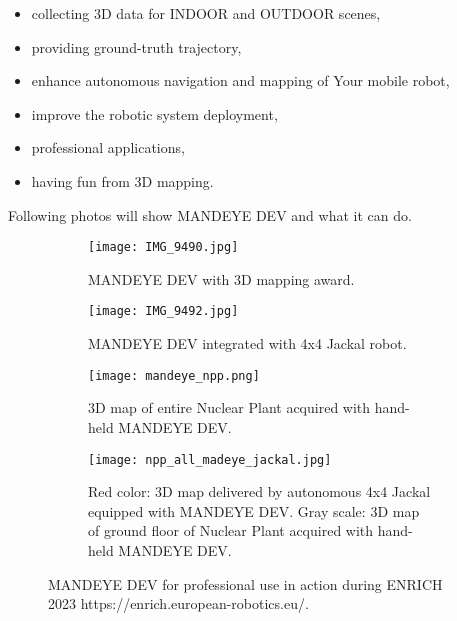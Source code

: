 \begin{itemize}
	\item collecting 3D data for INDOOR and OUTDOOR scenes,
	\item providing ground-truth trajectory,
	\item enhance autonomous navigation and mapping of Your mobile robot,
	\item improve the robotic system deployment,
	\item professional applications,
	\item having fun from 3D mapping.
\end{itemize}
Following photos will show MANDEYE DEV and what it can do.


 \begin{figure}
 	\centering
 	\begin{subfigure}[b]{0.4\textwidth}
 		\centering
 		\texttt{[image: IMG\_9490.jpg]}
 		\caption{MANDEYE DEV with 3D mapping award.}
 		\label{fig:a}
 	\end{subfigure}
 	\hfill
 	\begin{subfigure}[b]{0.4\textwidth}
 		\centering
 		\texttt{[image: IMG\_9492.jpg]}
 		\caption{MANDEYE DEV integrated with 4x4 Jackal robot.}
 		\label{fig:b}
 	\end{subfigure}
 	\hfill
 	\begin{subfigure}[b]{0.7\textwidth}
 		\centering
 		\texttt{[image: mandeye\_npp.png]}
 		\caption{3D map of entire Nuclear Plant acquired with hand-held MANDEYE DEV.}
 		\label{fig:c}
 	\end{subfigure}
 	\hfill
 	\begin{subfigure}[b]{0.7\textwidth}
 		\centering
 		\texttt{[image: npp\_all\_madeye\_jackal.jpg]}
 		\caption{Red color: 3D map delivered by autonomous 4x4 Jackal equipped with MANDEYE DEV. Gray scale: 3D map of ground floor of Nuclear Plant acquired with hand-held MANDEYE DEV.}
 		\label{fig:d}
 	\end{subfigure}
  	\caption{MANDEYE DEV for professional use in action during ENRICH 2023 https://enrich.european-robotics.eu/.}
 	\label{fig:abcd}
 \end{figure}

